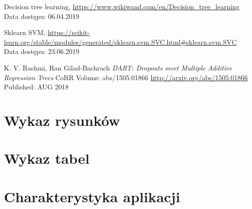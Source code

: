 \documentclass[a4paper, twoside, 11pt, openright]{article}
\begin{document}
\begin{thebibliography}{9}
	Decision tree learning, \url{https://www.wikiwand.com/en/Decision_tree_learning} 
	Data dostępu: 06.04.2019

	Sklearn SVM, \url{https://scikit-learn.org/stable/modules/generated/sklearn.svm.SVC.html#sklearn.svm.SVC}
	Data dostępu: 23.06.2019

	K. V. Rashmi, Ran Gilad-Bachrach
	\textit{DART: Dropouts meet Multiple Additive Regression Trees}
	CoRR Volume: abs/1505.01866 \url{http://arxiv.org/abs/1505.01866} Published: AUG 2018

\end{thebibliography}

\section{Wykaz rysunków}

\section{Wykaz tabel}

\section{Charakterystyka aplikacji}
\end{document}
